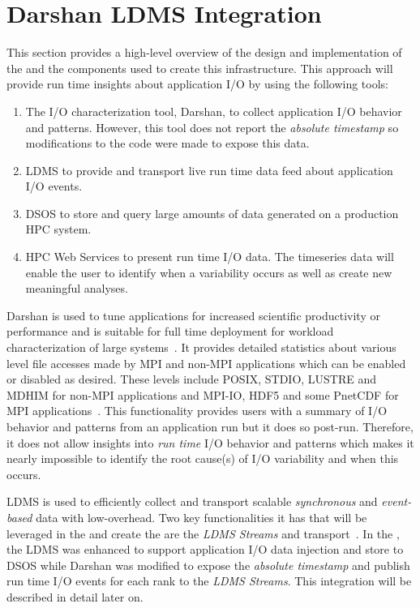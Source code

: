 \section{Darshan LDMS Integration}
\label{sec:DarshanLDMSIntegration}

This section provides a high-level overview of the design and implementation of the \Darshan and the components used to create this infrastructure. 
This approach will provide run time insights about application I/O by using the following tools:
\begin{enumerate}
	\item The I/O characterization tool, Darshan, to collect application I/O behavior and patterns. However, this tool does not report the \emph{absolute timestamp} so modifications to the code were made to expose this data.
	\item LDMS to provide and transport live run time data feed about application I/O events.~\cite{ldmsgithubwiki}
	\item DSOS to store and query large amounts of data generated on a production HPC system.~\cite{sosgithub}
	\item HPC Web Services to present run time I/O data. The timeseries data will enable the user to identify when a variability occurs as well as create new meaningful analyses.~\cite{ClusterAV}
\end{enumerate}

Darshan is used to tune applications for increased scientific productivity or performance and is suitable for full time deployment for workload characterization of large systems~\cite{darshan-webpage}. It provides detailed statistics about various level file accesses made by MPI and non-MPI applications which can be enabled or disabled as desired. These levels include POSIX, STDIO, LUSTRE and MDHIM for non-MPI applications and MPI-IO, HDF5 and some PnetCDF for MPI applications~\cite{darshan-runtime}. This functionality provides users with a summary of I/O behavior and patterns from an application run but it does so post-run. Therefore, it does not allow insights into \emph{run time} I/O behavior and patterns which makes it nearly impossible to identify the root cause(s) of I/O variability and when this occurs. 

LDMS is used to efficiently collect and transport scalable \emph{synchronous} and \emph{event-based} data with low-overhead. Two key functionalities it has that will be leveraged in the \Darshan and create the \connector are the \emph{LDMS Streams} and transport~\cite{ldmsgithub}. In the \Darshan, the LDMS was enhanced to support application I/O data injection and store to DSOS while Darshan was modified to expose the \emph{absolute timestamp} and publish run time I/O events for each rank to the \emph{LDMS Streams}. This integration will be described in detail later on.   

